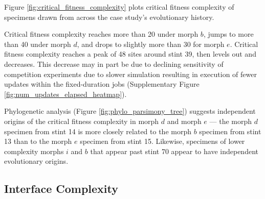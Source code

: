 

Figure \ref{fig:critical_fitness_complexity} plots critical fitness complexity of specimens drawn from across the case study's evolutionary history.

Critical fitness complexity reaches more than 20 under morph $b$, jumps to more than 40 under morph $d$, and drops to slightly more than 30 for morph $e$.
Critical fitness complexity reaches a peak of 48 sites around stint 39, then levels out and decreases.
This decrease may in part be due to declining sensitivity of competition experiments due to slower simulation resulting in execution of fewer updates within the fixed-duration jobs (Supplementary Figure \ref{fig:num_updates_elapsed_heatmap}).

Phylogenetic analysis (Figure \ref{fig:phylo_parsimony_tree}) suggests independent origins of the critical fitness complexity in morph $d$ and morph $e$ --- the morph $d$ specimen from stint 14 is more closely related to the morph $b$ specimen from stint 13 than to the morph $e$ specimen from stint 15.
Likewise, specimens of lower complexity morphs $i$ and $b$ that appear past stint 70 appear to have independent evolutionary origins.




\subsection{Interface Complexity}



